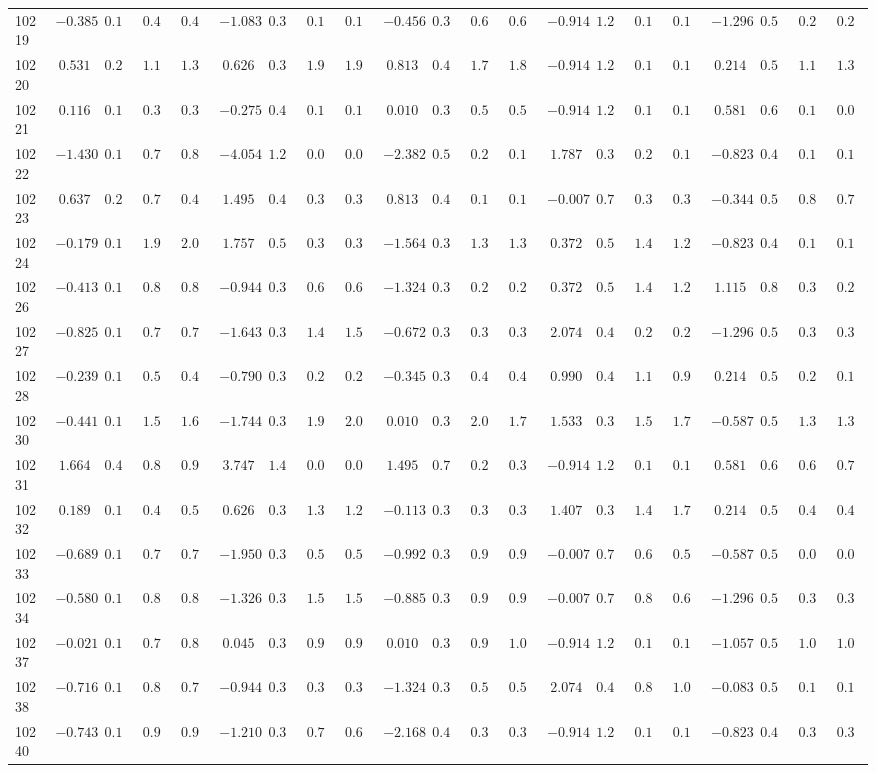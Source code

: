 \documentclass[6pt]{article}
\begin{document}
\begin{landscape}
{\begin{longtable}{lrrrrrrrrrrrrrrrrrrrr}
10219&$-0.385$&$0.170$&$0.454$&$0.427$&$-1.083$&$0.364$&$0.171$&$0.174$&$-0.456$&$0.337$&$0.676$&$0.666$&$-0.914$&$1.254$&$0.135$&$0.149$&$-1.296$&$0.509$&$0.275$&$0.263$\tabularnewline
10220&$ 0.531$&$0.227$&$1.140$&$1.367$&$ 0.626$&$0.393$&$1.926$&$1.943$&$ 0.813$&$0.497$&$1.707$&$1.863$&$-0.914$&$1.254$&$0.135$&$0.149$&$ 0.214$&$0.594$&$1.183$&$1.322$\tabularnewline
10221&$ 0.116$&$0.190$&$0.353$&$0.320$&$-0.275$&$0.402$&$0.110$&$0.109$&$ 0.010$&$0.363$&$0.579$&$0.523$&$-0.914$&$1.254$&$0.135$&$0.149$&$ 0.581$&$0.677$&$0.154$&$0.093$\tabularnewline
10222&$-1.430$&$0.190$&$0.779$&$0.811$&$-4.054$&$1.200$&$0.092$&$0.099$&$-2.382$&$0.505$&$0.215$&$0.148$&$ 1.787$&$0.385$&$0.258$&$0.195$&$-0.823$&$0.499$&$0.101$&$0.100$\tabularnewline
10223&$ 0.637$&$0.240$&$0.738$&$0.466$&$ 1.495$&$0.495$&$0.346$&$0.303$&$ 0.813$&$0.497$&$0.164$&$0.108$&$-0.007$&$0.714$&$0.316$&$0.348$&$-0.344$&$0.520$&$0.845$&$0.793$\tabularnewline
10224&$-0.179$&$0.176$&$1.965$&$2.040$&$ 1.757$&$0.553$&$0.376$&$0.354$&$-1.564$&$0.364$&$1.337$&$1.314$&$ 0.372$&$0.563$&$1.401$&$1.249$&$-0.823$&$0.499$&$0.101$&$0.100$\tabularnewline
10226&$-0.413$&$0.169$&$0.841$&$0.835$&$-0.944$&$0.376$&$0.610$&$0.685$&$-1.324$&$0.346$&$0.251$&$0.256$&$ 0.372$&$0.563$&$1.401$&$1.249$&$ 1.115$&$0.851$&$0.303$&$0.292$\tabularnewline
10227&$-0.825$&$0.167$&$0.743$&$0.729$&$-1.643$&$0.331$&$1.498$&$1.501$&$-0.672$&$0.332$&$0.324$&$0.321$&$ 2.074$&$0.423$&$0.205$&$0.235$&$-1.296$&$0.509$&$0.326$&$0.334$\tabularnewline
10228&$-0.239$&$0.174$&$0.522$&$0.406$&$-0.790$&$0.389$&$0.275$&$0.279$&$-0.345$&$0.341$&$0.448$&$0.464$&$ 0.990$&$0.414$&$1.138$&$0.983$&$ 0.214$&$0.594$&$0.256$&$0.188$\tabularnewline
10230&$-0.441$&$0.169$&$1.544$&$1.607$&$-1.744$&$0.331$&$1.999$&$2.063$&$ 0.010$&$0.363$&$2.000$&$1.786$&$ 1.533$&$0.373$&$1.534$&$1.752$&$-0.587$&$0.505$&$1.301$&$1.300$\tabularnewline
10231&$ 1.664$&$0.476$&$0.874$&$0.975$&$ 3.747$&$1.435$&$0.083$&$0.086$&$ 1.495$&$0.741$&$0.273$&$0.309$&$-0.914$&$1.254$&$0.135$&$0.149$&$ 0.581$&$0.677$&$0.678$&$0.730$\tabularnewline
10232&$ 0.189$&$0.195$&$0.477$&$0.528$&$ 0.626$&$0.393$&$1.330$&$1.273$&$-0.113$&$0.354$&$0.313$&$0.345$&$ 1.407$&$0.376$&$1.445$&$1.785$&$ 0.214$&$0.594$&$0.498$&$0.462$\tabularnewline
10233&$-0.689$&$0.166$&$0.712$&$0.715$&$-1.950$&$0.341$&$0.518$&$0.527$&$-0.992$&$0.333$&$0.935$&$0.941$&$-0.007$&$0.714$&$0.602$&$0.575$&$-0.587$&$0.505$&$0.042$&$0.043$\tabularnewline
10234&$-0.580$&$0.167$&$0.808$&$0.818$&$-1.326$&$0.343$&$1.571$&$1.543$&$-0.885$&$0.332$&$0.978$&$0.983$&$-0.007$&$0.714$&$0.866$&$0.660$&$-1.296$&$0.509$&$0.326$&$0.334$\tabularnewline
10237&$-0.021$&$0.182$&$0.792$&$0.859$&$ 0.045$&$0.393$&$0.988$&$0.961$&$ 0.010$&$0.363$&$0.999$&$1.060$&$-0.914$&$1.254$&$0.135$&$0.149$&$-1.057$&$0.501$&$1.059$&$1.029$\tabularnewline
10238&$-0.716$&$0.166$&$0.825$&$0.771$&$-0.944$&$0.376$&$0.330$&$0.302$&$-1.324$&$0.346$&$0.586$&$0.541$&$ 2.074$&$0.423$&$0.873$&$1.001$&$-0.083$&$0.547$&$0.104$&$0.101$\tabularnewline
10240&$-0.743$&$0.166$&$0.948$&$0.943$&$-1.210$&$0.352$&$0.707$&$0.686$&$-2.168$&$0.453$&$0.379$&$0.357$&$-0.914$&$1.254$&$0.135$&$0.149$&$-0.823$&$0.499$&$0.391$&$0.391$\tabularnewline
\hline
\end{longtable}}\end{landscape}
\end{document}
